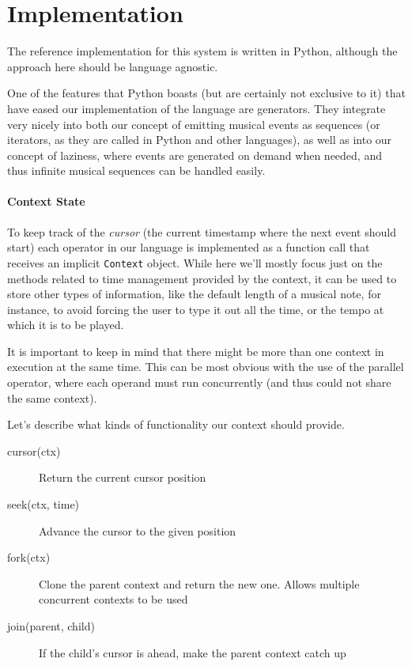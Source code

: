 \documentclass[a4paper,UKenglish,cleveref, autoref]{oasics-v2019}
\begin{document}
\section{Implementation}
The reference implementation for this system is written in Python, although the approach here should be language agnostic.

One of the features that Python boasts (but are certainly not exclusive to it) that have eased our implementation of the language are generators\cite{PEP255}. They integrate very nicely into both our concept of emitting musical events as sequences (or iterators, as they are called in Python and other languages), as well as into our concept of laziness, where events are generated on demand when needed, and thus infinite musical sequences can be handled easily.

\paragraph*{Context State}
To keep track of the \textit{cursor} (the current timestamp where the next event should start) each operator in our language is implemented as a function call that receives an implicit \texttt{Context} object. While here we'll mostly focus just on the methods related to time management provided by the context, it can be used to store other types of information, like the default length of a musical note, for instance, to avoid forcing the user to type it out all the time, or the tempo at which it is to be played.

It is important to keep in mind that there might be more than one context in execution at the same time. This can be most obvious with the use of the parallel operator, where each operand must run concurrently (and thus could not share the same context).

Let's describe what kinds of functionality our context should provide.

\begin{description}
    \item[cursor(ctx)] Return the current cursor position
    \item[seek(ctx, time)] Advance the cursor to the given position
    \item[fork(ctx)] Clone the parent context and return the new one. Allows multiple concurrent contexts to be used
    \item[join(parent, child)] If the child's cursor is ahead, make the parent context catch up
\end{description}
\end{document}
